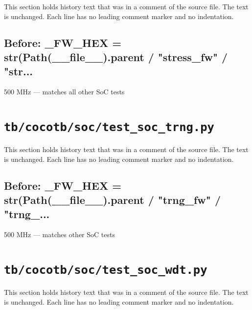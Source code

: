 This section holds history text that was in a comment of the source file. The text is unchanged. Each line has no leading comment marker and no indentation.

\begin{record}

\subsection*{Before: \_FW\_HEX = str(Path(\_\_file\_\_).parent / "stress\_fw" / "str...}

\begin{textblock}
500 MHz — matches all other SoC tests
\end{textblock}

\end{record}

\section{\texttt{tb/cocotb/soc/test\_soc\_trng.py}}\label{cr:suite:soc-test-soc-trng}

This section holds history text that was in a comment of the source file. The text is unchanged. Each line has no leading comment marker and no indentation.

\begin{record}

\subsection*{Before: \_FW\_HEX = str(Path(\_\_file\_\_).parent / "trng\_fw" / "trng\_...}

\begin{textblock}
500 MHz — matches other SoC tests
\end{textblock}

\end{record}

\section{\texttt{tb/cocotb/soc/test\_soc\_wdt.py}}\label{cr:suite:soc-test-soc-wdt}

This section holds history text that was in a comment of the source file. The text is unchanged. Each line has no leading comment marker and no indentation.


